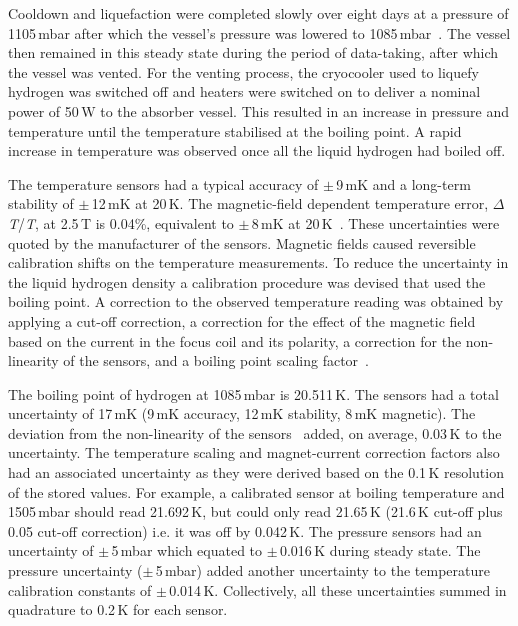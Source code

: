 Cooldown and liquefaction were completed slowly over eight days at a
pressure of 1105\,mbar after which the vessel's pressure was lowered to
1085\,mbar~\cite{1748-0221-13-09-T09008}.
The vessel then remained in this steady state during the period of data-taking, after which the vessel was vented. For the venting process,
the cryocooler used to liquefy hydrogen was
switched off and heaters were switched on to deliver a nominal power
of 50\,W to the absorber vessel.
This resulted in an increase in pressure and temperature until the
temperature stabilised at the boiling point.
A rapid increase in temperature was observed once all the
liquid hydrogen had boiled off. 

The temperature sensors had a typical accuracy of
$\mathrm{\pm}$\,9\,mK and a long-term stability of
$\mathrm{\pm}$\,12\,mK at 20\,K.
The magnetic-field dependent temperature error, $\Delta$\textit{T}/\textit{T}, at 2.5\,T is 0.04\%,
equivalent to $\mathrm{\pm}$\,8\,mK at
20\,K~\cite{TemperatureMeasurement}.
These uncertainties were quoted by the manufacturer of the sensors.
Magnetic fields caused reversible calibration shifts on the temperature
measurements.
To reduce the uncertainty in the liquid hydrogen density a calibration
procedure was devised that used the boiling point.
A correction to the observed temperature reading was obtained by
applying a cut-off correction, a correction for the effect of the
magnetic field based on the current in the focus coil and its
polarity, a correction for the non-linearity of the sensors, and a 
boiling point scaling factor~\cite{NOTE524}.  
 
The boiling point of hydrogen at 1085\,mbar is 20.511\,K.
The sensors had a total uncertainty of 17\,mK (9\,mK accuracy, 12\,mK
stability, 8\,mK magnetic).
The deviation from the non-linearity of the sensors~\cite{TemperatureMeasurement} added, on average,
0.03\,K to the uncertainty.
The temperature scaling and magnet-current correction factors also
had an associated uncertainty as they were derived based on the 0.1\,K resolution of the stored values.
For example, a calibrated sensor at boiling temperature and 1505\,mbar
should read 21.692\,K, but could only read 21.65\,K (21.6\,K cut-off
plus 0.05 cut-off correction) i.e. it was off by 0.042\,K.
The pressure sensors had an uncertainty of $\mathrm{\pm}$\,5\,mbar
which equated to $\mathrm{\pm}$\,0.016\,K during steady state.
The pressure uncertainty ($\mathrm{\pm}$\,5\,mbar) added another
uncertainty to the temperature calibration constants of
$\mathrm{\pm}$\,0.014\,K.
Collectively, all these uncertainties summed in quadrature to 0.2\,K for
each sensor.
 
